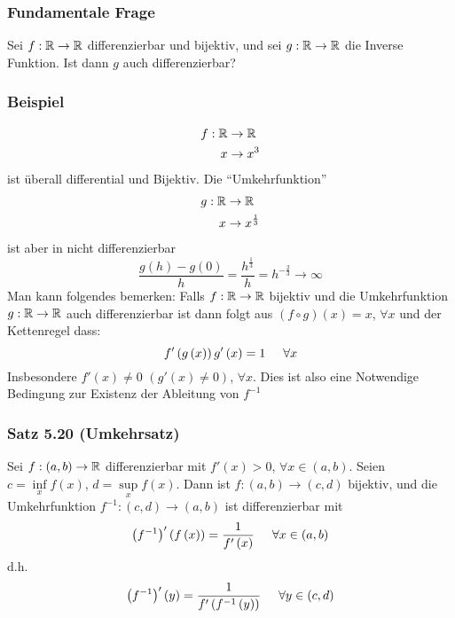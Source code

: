\subsubsection*{Fundamentale Frage}
Sei $f:\mathbb{R}\to\mathbb{R}$ differenzierbar und bijektiv, und sei $g:\mathbb{R}\to\mathbb{R}$ die Inverse Funktion. Ist dann $g$ auch differenzierbar?

\subsubsection*{Beispiel}
\begin{align*}
f:\mathbb{R}&\to\mathbb{R}\\
x&\to x^3
\end{align*}
ist überall differential und Bijektiv. Die ``Umkehrfunktion''
\begin{align*}
g:\mathbb{R}&\to\mathbb{R}\\
x&\to x^{1\over 3}
\end{align*}
ist aber in  nicht differenzierbar 
\[\frac{{g\left( h \right) - g\left( 0 \right)}}{h} = \frac{{{h^{\frac{1}{3}}}}}{h} = {h^{ - \frac{2}{3}}} \to \infty \]
Man kann folgendes bemerken: Falls $f:\mathbb{R}\to\mathbb{R}$ bijektiv und die Umkehrfunktion $g:\mathbb{R}\to\mathbb{R}$ auch differenzierbar ist dann folgt aus $\left( f\circ g\right)(x)=x$, $\forall x$ und der Kettenregel dass:
\[f'\left( {g\left( x \right)} \right)g'\left( x \right) = 1\hspace{5mm}\forall x\]
Insbesondere $f'(x)\not=0$ $\left(g'(x)\not=0\right)$, $\forall x$. Dies ist also eine Notwendige Bedingung zur Existenz  der Ableitung von $f^{-1}$

\subsubsection*{Satz 5.20 (Umkehrsatz)}
Sei $f:\left( a,b\right)\to\mathbb{R}$ differenzierbar mit $f'(x)>0$, $\forall x\in\left( a,b\right)$. Seien $c = \mathop {\inf }\limits_x f\left( x \right)$, $d = \mathop {\sup }\limits_x f\left( x \right)$. Dann ist $f:\left( a,b\right)\to\left( c,d\right)$ bijektiv, und die Umkehrfunktion $f^{-1}:\left( c,d\right)\to\left( a,b\right)$ ist differenzierbar mit 
\[\left( {{f^{ - 1}}} \right)'\left( {f\left( x \right)} \right) = \frac{1}{{f'\left( x \right)}}\hspace{5mm}\forall x \in \left( {a,b} \right)\]
d.h.
\[\left( {{f^{ - 1}}} \right)'\left(y \right) = \frac{1}{{f'\left( {{f^{ - 1}}}\left( y\right) \right)}}\hspace{5mm}\forall y \in \left( {c,d} \right)\]

